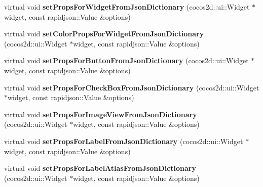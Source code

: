 \begin{DoxyCompactItemize}
\item 
\mbox{\label{classcocostudio_1_1WidgetPropertiesReader0250_a2489da434229710e8e8675ae915083ab}} 
virtual void {\bfseries set\+Props\+For\+Widget\+From\+Json\+Dictionary} (cocos2d\+::ui\+::\+Widget $\ast$widget, const rapidjson\+::\+Value \&options)
\item 
\mbox{\label{classcocostudio_1_1WidgetPropertiesReader0250_a051b8ad9268513f3ca001e556ab546da}} 
virtual void {\bfseries set\+Color\+Props\+For\+Widget\+From\+Json\+Dictionary} (cocos2d\+::ui\+::\+Widget $\ast$widget, const rapidjson\+::\+Value \&options)
\item 
\mbox{\label{classcocostudio_1_1WidgetPropertiesReader0250_a5b249caf59c41786fd7ff349932e1797}} 
virtual void {\bfseries set\+Props\+For\+Button\+From\+Json\+Dictionary} (cocos2d\+::ui\+::\+Widget $\ast$widget, const rapidjson\+::\+Value \&options)
\item 
\mbox{\label{classcocostudio_1_1WidgetPropertiesReader0250_a23456963bd8c8423422035764630184d}} 
virtual void {\bfseries set\+Props\+For\+Check\+Box\+From\+Json\+Dictionary} (cocos2d\+::ui\+::\+Widget $\ast$widget, const rapidjson\+::\+Value \&options)
\item 
\mbox{\label{classcocostudio_1_1WidgetPropertiesReader0250_ab1c61b4266e3bcbf2f922901a704557b}} 
virtual void {\bfseries set\+Props\+For\+Image\+View\+From\+Json\+Dictionary} (cocos2d\+::ui\+::\+Widget $\ast$widget, const rapidjson\+::\+Value \&options)
\item 
\mbox{\label{classcocostudio_1_1WidgetPropertiesReader0250_ab0ec30f31f1227395931b740dcc10439}} 
virtual void {\bfseries set\+Props\+For\+Label\+From\+Json\+Dictionary} (cocos2d\+::ui\+::\+Widget $\ast$widget, const rapidjson\+::\+Value \&options)
\item 
\mbox{\label{classcocostudio_1_1WidgetPropertiesReader0250_a280839fe8e417da0302d127e4241b236}} 
virtual void {\bfseries set\+Props\+For\+Label\+Atlas\+From\+Json\+Dictionary} (cocos2d\+::ui\+::\+Widget $\ast$widget, const rapidjson\+::\+Value \&options)

\end{DoxyCompactItemize}
